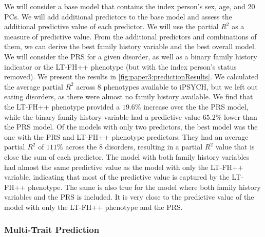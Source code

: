 We will consider a base model that contains the index person's sex, age, and $ 20 $ PCs. We will add additional predictors to the base model and assess the additional predictive value of each predictor. We will use the partial $ R^2 $ as a measure of predictive value. From the additional predictors and combinations of them, we can derive the best family history variable and the best overall model. We will consider the PRS for a given disorder, as well as a binary family history indicator or the LT-FH++ phenotype (but with the index person's status removed). We present the results in \cref{fig:paper3:predictionResults}. We calculated the average partial $ R^2 $ across $ 8 $ phenotypes available to iPSYCH, but we left out eating disorders, as there were almost no family history available. We find that the LT-FH++ phenotype provided a $ 19.6\% $ increase over the the PRS model, while the binary family history variable had a predictive value $ 65.2\% $ lower than the PRS model. Of the models with only two predictors, the best model was the one with the PRS and LT-FH++ phenotype predictors. They had an average partial $ R^2 $ of $ 111\% $ across the $ 8 $ disorders, resulting in a partial $ R^2 $ value that is close the sum of each predictor. The model with both family history variables had almost the same predictive value as the model with only the LT-FH++ variable, indicating that most of the predictive value is captured by the LT-FH++ phenotype. The same is also true for the model where both family history variables and the PRS is included. It is very close to the predictive value of the model with only the LT-FH++ phenotype and the PRS.

\subsubsection{Multi-Trait Prediction}

